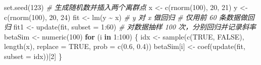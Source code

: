 \documentclass[
  b5paper,
  UTF8,twoside]{book}
\newenvironment{Shaded}{\begin{snugshade}}{\end{snugshade}}
\newcommand{\AttributeTok}[1]{\textcolor[rgb]{0.77,0.63,0.00}{#1}}
\newcommand{\CommentTok}[1]{\textcolor[rgb]{0.56,0.35,0.01}{\textit{#1}}}
\newcommand{\ConstantTok}[1]{\textcolor[rgb]{0.00,0.00,0.00}{#1}}
\newcommand{\ControlFlowTok}[1]{\textcolor[rgb]{0.13,0.29,0.53}{\textbf{#1}}}
\newcommand{\DecValTok}[1]{\textcolor[rgb]{0.00,0.00,0.81}{#1}}
\newcommand{\FloatTok}[1]{\textcolor[rgb]{0.00,0.00,0.81}{#1}}
\newcommand{\FunctionTok}[1]{\textcolor[rgb]{0.00,0.00,0.00}{#1}}
\newcommand{\NormalTok}[1]{#1}
\newcommand{\OtherTok}[1]{\textcolor[rgb]{0.56,0.35,0.01}{#1}}
\newcommand{\SpecialCharTok}[1]{\textcolor[rgb]{0.00,0.00,0.00}{#1}}
\begin{document}
\begin{Shaded}
\begin{Highlighting}[]
\FunctionTok{set.seed}\NormalTok{(}\DecValTok{123}\NormalTok{)}
\CommentTok{\# 生成随机数并插入两个离群点}
\NormalTok{x }\OtherTok{\textless{}{-}} \FunctionTok{c}\NormalTok{(}\FunctionTok{rnorm}\NormalTok{(}\DecValTok{100}\NormalTok{), }\DecValTok{20}\NormalTok{, }\DecValTok{21}\NormalTok{)}
\NormalTok{y }\OtherTok{\textless{}{-}} \FunctionTok{c}\NormalTok{(}\FunctionTok{rnorm}\NormalTok{(}\DecValTok{100}\NormalTok{), }\DecValTok{20}\NormalTok{, }\DecValTok{24}\NormalTok{)}
\NormalTok{fit }\OtherTok{\textless{}{-}} \FunctionTok{lm}\NormalTok{(y }\SpecialCharTok{\textasciitilde{}}\NormalTok{ x) }\CommentTok{\# y 对 x 做回归}
\CommentTok{\# 仅用前 60 条数据做回归}
\NormalTok{fit1 }\OtherTok{\textless{}{-}} \FunctionTok{update}\NormalTok{(fit, }\AttributeTok{subset =} \DecValTok{1}\SpecialCharTok{:}\DecValTok{60}\NormalTok{)}
\CommentTok{\# 对数据抽样 100 次，分别回归并记录斜率}
\NormalTok{betaSim }\OtherTok{\textless{}{-}} \FunctionTok{numeric}\NormalTok{(}\DecValTok{100}\NormalTok{)}
\ControlFlowTok{for}\NormalTok{ (i }\ControlFlowTok{in} \DecValTok{1}\SpecialCharTok{:}\DecValTok{100}\NormalTok{) \{}
\NormalTok{  idx }\OtherTok{\textless{}{-}} \FunctionTok{sample}\NormalTok{(}\FunctionTok{c}\NormalTok{(}\ConstantTok{TRUE}\NormalTok{, }\ConstantTok{FALSE}\NormalTok{), }\FunctionTok{length}\NormalTok{(x), }\AttributeTok{replace =} \ConstantTok{TRUE}\NormalTok{, }
                \AttributeTok{prob =} \FunctionTok{c}\NormalTok{(}\FloatTok{0.6}\NormalTok{, }\FloatTok{0.4}\NormalTok{))}
\NormalTok{  betaSim[i] }\OtherTok{\textless{}{-}} \FunctionTok{coef}\NormalTok{(}\FunctionTok{update}\NormalTok{(fit, }\AttributeTok{subset =}\NormalTok{ idx))[}\DecValTok{2}\NormalTok{]}
\NormalTok{\}}
\end{Highlighting}
\end{Shaded}
\end{document}
